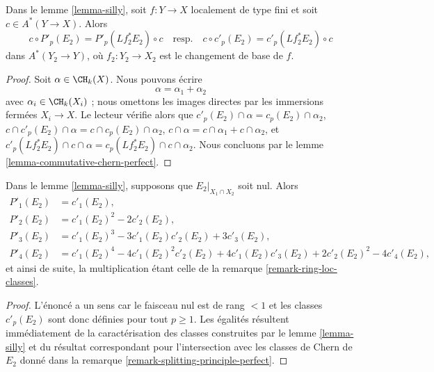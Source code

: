 \begin{lemma}
\label{lemma-silly-commutes}
Dans le lemme \ref{lemma-silly}, soit $f : Y \to X$ localement de type fini
et soit $c \in A^*(Y \to X)$. Alors
$$
c \circ P'_p(E_2) = P'_p(Lf_2^*E_2) \circ c
\quad\text{resp.}\quad
c \circ c'_p(E_2) = c'_p(Lf_2^*E_2) \circ c
$$
dans $A^*(Y_2 \to Y)$, où $f_2 : Y_2 \to X_2$ est le changement de base de $f$.
\end{lemma}

\begin{proof}
Soit $\alpha \in \CH_k(X)$. Nous pouvons écrire
$$
\alpha = \alpha_1 + \alpha_2
$$
avec $\alpha_i \in \CH_k(X_i)$ ; nous omettons les images directes
par les immersions fermées $X_i \to X$. Le lecteur vérifie alors que
$c'_p(E_2) \cap \alpha = c_p(E_2) \cap \alpha_2$,
$c \cap c'_p(E_2) \cap \alpha = c \cap c_p(E_2) \cap \alpha_2$,
$c \cap \alpha = c \cap \alpha_1 + c \cap \alpha_2$, et
$c'_p(Lf_2^*E_2) \cap c \cap \alpha = c_p(Lf_2^*E_2) \cap c \cap \alpha_2$.
Nous concluons par le lemme \ref{lemma-commutative-chern-perfect}.
\end{proof}

\begin{lemma}
\label{lemma-silly-compose}
Dans le lemme \ref{lemma-silly}, supposons que $E_2|_{X_1 \cap X_2}$ soit nul. Alors
\begin{align*}
P'_1(E_2) & = c'_1(E_2), \\
P'_2(E_2) & = c'_1(E_2)^2 - 2c'_2(E_2), \\
P'_3(E_2) & = c'_1(E_2)^3 - 3c'_1(E_2)c'_2(E_2) + 3c'_3(E_2), \\
P'_4(E_2) & = c'_1(E_2)^4 - 4c'_1(E_2)^2c'_2(E_2) +
4c'_1(E_2)c'_3(E_2) + 2c'_2(E_2)^2 - 4c'_4(E_2),
\end{align*}
et ainsi de suite, la multiplication étant celle de la remarque \ref{remark-ring-loc-classes}.
\end{lemma}

\begin{proof}
L'énoncé a un sens car le faisceau nul est de rang $< 1$ et
les classes $c'_p(E_2)$ sont donc définies pour tout $p \geq 1$. Les égalités
résultent immédiatement de la caractérisation des classes construites
par le lemme \ref{lemma-silly} et du résultat correspondant pour
l'intersection avec les classes de Chern de $E_2$ donné dans la
remarque \ref{remark-splitting-principle-perfect}.
\end{proof}

